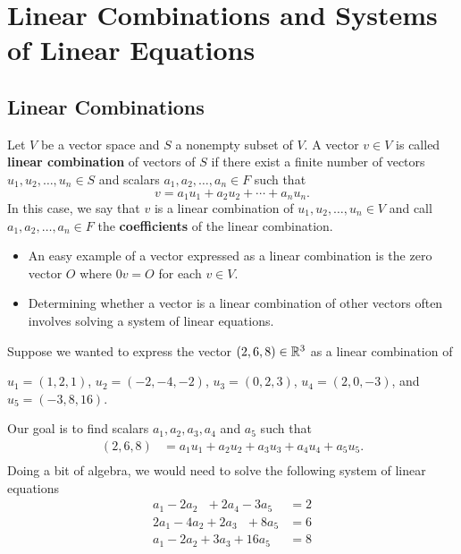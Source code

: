 \section{Linear Combinations and Systems of Linear Equations}

\subsection{Linear Combinations}

\begin{definition}
   Let \( V  \) be a vector space and \( S  \) a nonempty subset of \( V  \). A vector \( v \in V  \) is called \textbf{linear combination} of vectors of \( S  \) if there exist a finite number of vectors \( u_{1} , u_{2}, \dots, u_{n} \in S  \) and scalars \( a_{1}, a_{2} , \dots, a_{n} \in F  \) such that 
   \[  v = a_{1} u_{1} + a_{2} u_{2} + \cdots + a_{n} u_{n}. \] In this case, we say that \( v \) is a linear combination of \( u_{1} , u_{2} , \dots, u_{n} \in V   \) and call \( a_{1} , a_{2} , \dots, a_{n} \in F   \) the \textbf{coefficients} of the linear combination. 
\end{definition}

\begin{itemize}
    \item An easy example of a vector expressed as a linear combination is the zero vector \( O  \) where \( 0 v = O  \) for each \( v \in V  \).
    \item Determining whether a vector is a linear combination of other vectors often involves solving a system of linear equations.
\end{itemize}

\begin{eg}
    Suppose we wanted to express the vector \( (2,6,8) \in \mathbb{R}^{3}  \) as a linear combination of 
    \begin{center}
    \( u_{1} = (1,2,1)  \), \( u_{2} = (-2, -4, -2) \), \( u_{3} = (0,2,3) \), \( u_{4} = (2,0,-3) \), and \( u_{5} = (-3, 8, 16) \).
    \end{center}
    Our goal is to find scalars \( a_{1}, a_{2}, a_{3}, a_{4} \) and \( a_{5}  \) such that 
    \begin{align*}
        (2,6,8) &= a_{1} u_{1} + a_{2} u_{2} + a_{3} u_{3} + a_{4} u_{4} + a_{5}  u_{5}.   \\
    \end{align*}
    Doing a bit of algebra, we would need to solve the following system of linear equations 
    \begin{align*}
        a_{1} - 2a_{2}  \ \ \  + 2a_{4} - 3a_{5} &= 2  \\
        2a_{1} - 4a_{2} + 2a_{3}  \ \ \  + 8a_{5} &= 6  \\
        a_{1} - 2a_{2} + 3a_{3} + 16a_{5} &= 8
    \end{align*}
\end{eg}

